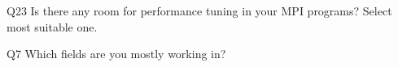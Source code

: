 \begin{description}%
\item{Q23} Is there any room for performance tuning in your MPI programs? Select most suitable one.%
\item{Q7} Which fields are you mostly working in?%
\end{description}%
